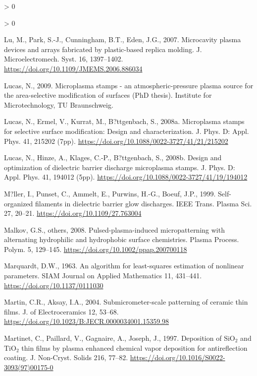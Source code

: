 \documentclass[
  11pt,
  twoside]{article}
\newlength{\cslhangindent}
\newenvironment{CSLReferences}[2] %
 {%
  \setlength{\parindent}{0pt}
  \ifodd #1 \everypar{\setlength{\hangindent}{\cslhangindent}}\ignorespaces\fi
  \ifnum #2 > 0
  \setlength{\parskip}{#2\baselineskip}
  \fi
 }%
 {}
\begin{document}
\begin{CSLReferences}{1}{0}
\begin{CSLReferences}{1}{0}
\leavevmode\hypertarget{ref-Lu07}{}%
Lu, M., Park, S.-J., Cunningham, B.T., Eden, J.G., 2007. Microcavity plasma devices and arrays fabricated by plastic-based replica molding. J. Microelectromech. Syst. 16, 1397--1402. \url{https://doi.org/10.1109/JMEMS.2006.886034}

\leavevmode\hypertarget{ref-Luca09}{}%
Lucas, N., 2009. Microplasma stamps - an atmospheric-pressure plasma source for the area-selective modification of surfaces (PhD thesis). Institute for Microtechnology, TU Braunschweig.

\leavevmode\hypertarget{ref-Luca08-2}{}%
Lucas, N., Ermel, V., Kurrat, M., B?ttgenbach, S., 2008a. Microplasma stamps for selective surface modification: Design and characterization. J. Phys. D: Appl. Phys. 41, 215202 (7pp). \url{https://doi.org/10.1088/0022-3727/41/21/215202}

\leavevmode\hypertarget{ref-Luca08-1}{}%
Lucas, N., Hinze, A., Klages, C.-P., B?ttgenbach, S., 2008b. Design and optimization of dielectric barrier discharge microplasma stamps. J. Phys. D: Appl. Phys. 41, 194012 (5pp). \url{https://doi.org/10.1088/0022-3727/41/19/194012}

\leavevmode\hypertarget{ref-Muel1999}{}%
M?ller, I., Punset, C., Ammelt, E., Purwins, H.-G., Boeuf, J.P., 1999. Self-organized filaments in dielectric barrier glow discharges. IEEE Trans. Plasma Sci. 27, 20--21. \url{https://doi.org/10.1109/27.763004}

\leavevmode\hypertarget{ref-Malk08}{}%
Malkov, G.S., others, 2008. Pulsed-plasma-induced micropatterning with alternating hydrophilic and hydrophobic surface chemistries. Plasma Process. Polym. 5, 129--145. \url{https://doi.org/10.1002/ppap.200700118}

\leavevmode\hypertarget{ref-Marq1963}{}%
Marquardt, D.W., 1963. An algorithm for least-squares estimation of nonlinear parameters. SIAM Journal on Applied Mathematics 11, 431--441. \url{https://doi.org/10.1137/0111030}

\leavevmode\hypertarget{ref-Mart04}{}%
Martin, C.R., Aksay, I.A., 2004. Submicrometer-scale patterning of ceramic thin films. J. of Electroceramics 12, 53--68. \url{https://doi.org/10.1023/B:JECR.0000034001.15359.98}

\leavevmode\hypertarget{ref-Mart1997}{}%
Martinet, C., Paillard, V., Gagnaire, A., Joseph, J., 1997. Deposition of \(\mathrm{SiO_2}\) and \(\mathrm{TiO_2}\) thin films by plasma enhanced chemical vapor deposition for antireflection coating. J. Non-Cryst. Solids 216, 77--82. \url{https://doi.org/10.1016/S0022-3093(97)00175-0}


\end{CSLReferences}
\end{CSLReferences}
\end{document}
